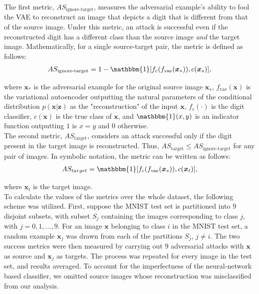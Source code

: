 \documentclass{report}
\begin{document}
\bigskip

\noindent The first metric, $AS_{\text{ignore-target}}$, measures the adversarial example's ability to fool the VAE to reconstruct an image that depicts a digit that is different from that of the source image. Under this metric, an attack is successful even if the reconstructed digit has a different class than the source image \textit{and} the target image. Mathematically, for a single source-target pair, the metric is defined as follows:
\begin{gather*}
AS_{\text{ignore-target}} = 1 - \mathbbm{1} [f_c(f_\text{vae}(\boldsymbol{x}_{*})), c(\boldsymbol{x}_s)],
\end{gather*}

\noindent where $\boldsymbol{x_*}$ is the adversarial example for the original source image $\boldsymbol{x}_s$, $f_\text{vae}(\boldsymbol{x})$ is the variational autoencoder outputting the natural parameters of the conditional distribution $p(\boldsymbol{x}|\boldsymbol{z})$ as the "reconstruction" of the input $\boldsymbol{x}$, $f_c(\cdot)$ is the digit classifier, $c(\boldsymbol{x})$ is the true class of $\boldsymbol{x}$, and $\mathbbm{1}(x, y)$ is an indicator function outputting $1$ is $x = y$ and $0$ otherwise. \\

\noindent The second metric, $AS_{\text{target}}$, considers an attack successful only if the digit present in the target image is reconstructed. Thus, $AS_{\text{target}} \leq AS_{\text{ignore-target}}$ for any pair of images. In symbolic notation, the metric can be written as follows:
\begin{gather*}
AS_{target} = \mathbbm{1} [f_c(f_\text{vae}(\boldsymbol{x}_{*})), c(\boldsymbol{x}_t)],
\end{gather*}

\noindent where $\boldsymbol{x}_t$ is the target image. \\

\noindent To calculate the values of the metrics over the whole dataset, the following scheme was utilized. First, suppose the MNIST test set is partitioned into 9 disjoint subsets, with subset $S_j$ containing the images corresponding to class $j$, with $j = 0, 1, \dots, 9$. For an image $\boldsymbol{x}$ belonging to class $i$ in the MNIST test set, a random example $\boldsymbol{x}_j$ was drawn from each of the partitions $S_j$, $j \neq i$. The two success metrics were then measured by carrying out $9$ adversarial attacks with $\boldsymbol{x}$ as source and $\boldsymbol{x}_j$ as targets. The process was repeated for every image in the test set, and results averaged. To account for the imperfectness of the neural-network based classifier, we omitted source images whose reconstruction was misclassified from our analysis.
\end{document}
